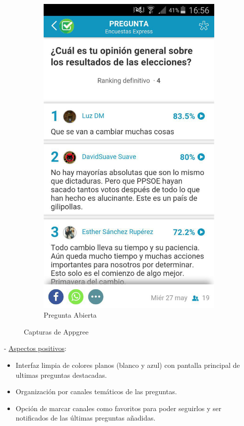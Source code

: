 \begin{figure}[H]
\begin{subfigure}[b]{0.3\textwidth}
                \includegraphics[width=\textwidth]{Media/Captures/appgreeOpenQuestion.jpg}
                \caption{Pregunta Abierta}
                \label{fig:appgreeOpenQuestion}
        \end{subfigure}
        \caption{Capturas de Appgree}\label{fig:appgreeCaptures}
\end{figure}

 - \underline{Aspectos positivos}:

\begin{itemize}
	\item Interfaz limpia de colores planos (blanco y azul) con pantalla principal de ultimas preguntas destacadas.
	\item Organización por canales temáticos de las preguntas.
	\item Opción de marcar canales como favoritos para poder seguirlos y ser notificados de las últimas preguntas añadidas.
\end{itemize}


